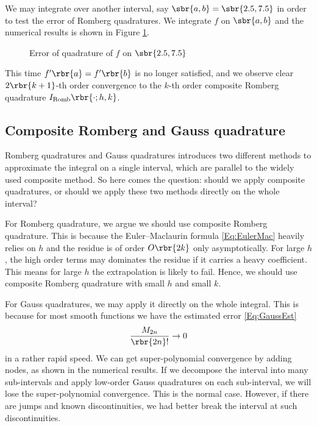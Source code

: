\documentclass[english, nochinese]{pnote}
\begin{document}
We may integrate over another interval, say $ \sbr{ a, b } = \sbr{ 2.5, 7.5 } $ in order to test the error of Romberg quadratures. We integrate $f$ on $ \sbr{ a, b } $ and the numerical results is shown in Figure \ref{Fig:Romb}.

\begin{figure}[htbp]
\centering
\scalebox{0.70}{}
\caption{Error of quadrature of $f$ on $ \sbr{ 2.5, 7.5 } $}
\label{Fig:Romb}
\end{figure}

This time $ f' \rbr{a} = f' \rbr{b} $ is no longer satisfied, and we observe clear $ 2 \rbr{ k + 1 } $-th order convergence to the $k$-th order composite Romberg quadrature $ I_{\text{Romb}} \rbr{ \cdot; h, k } $.

\subsection{Composite Romberg and Gauss quadrature}

Romberg quadratures and Gauss quadratures introduces two different methods to approximate the integral on a single interval, which are parallel to the widely used composite method. So here comes the question: should we apply composite quadratures, or should we apply these two methods directly on the whole interval?

For Romberg quadrature, we argue we should use composite Romberg quadrature. This is because the Euler--Maclaurin formula \eqref{Eq:EulerMac} heavily relies on $h$ and the residue is of order $ O \rbr{ 2 k } $ only asymptotically. For large $h$, the high order terms may dominates the residue if it carries a heavy coefficient. This means for large $h$ the extrapolation is likely to fail. Hence, we should use composite Romberg quadrature with small $h$ and small $k$.

For Gauss quadratures, we may apply it directly on the whole integral. This is because for most smooth functions we have the estimated error \ref{Eq:GaussEst}
\begin{equation}
\frac{M_{ 2 n }}{ \rbr{ 2 n } ! } \rightarrow 0
\end{equation}
in a rather rapid speed. We can get super-polynomial convergence by adding nodes, as shown in the numerical results. If we decompose the interval into many sub-intervals and apply low-order Gauss quadratures on each sub-interval, we will lose the super-polynomial convergence. This is the normal case. However, if there are jumps and known discontinuities, we had better break the interval at such discontinuities.
\end{document}
